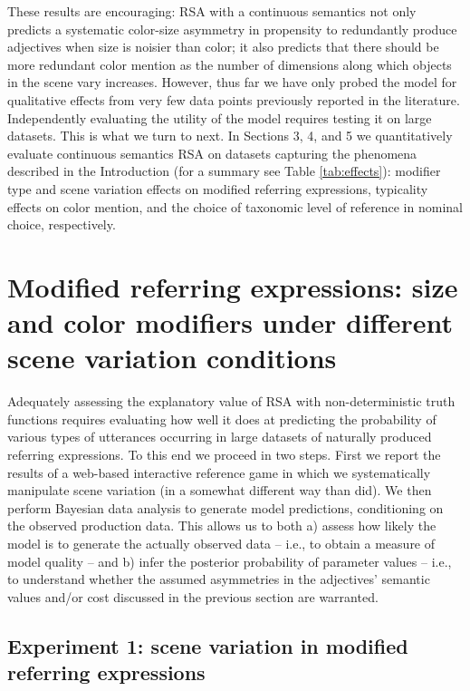 \documentclass[11pt]{article}
\newcommand{\tableref}[1]{Table \ref{#1}}
\begin{document}
These results are encouraging: RSA with a continuous semantics not only predicts a systematic color-size asymmetry in propensity to redundantly produce adjectives when size is noisier than color; it also predicts that there should be more redundant color mention as the number of dimensions along which objects in the scene vary increases. However, thus far we have only probed the model for qualitative effects from very few data points previously reported in the literature. Independently evaluating the utility of the model requires  testing it on large datasets. This is what we turn to next. In Sections 3, 4, and 5 we quantitatively evaluate continuous semantics RSA on datasets capturing the phenomena described in the Introduction (for a summary see \tableref{tab:effects}): modifier type and scene variation effects on modified referring expressions, typicality effects on color mention, and the choice of taxonomic level of reference in nominal choice, respectively.

\section{Modified referring expressions: size and color modifiers under different scene variation conditions}
\label{sec:rsaevaluationbasicscene}

Adequately assessing the explanatory value of RSA with non-deterministic truth functions requires evaluating how well it does at predicting the probability of various types of utterances occurring in large datasets of naturally produced referring expressions. To this end we proceed in two steps. First we report the results of a web-based interactive reference game in which we systematically manipulate scene variation (in a somewhat different way than  did). We then perform Bayesian data analysis to generate model predictions, conditioning on the observed production data. This allows us to both a) assess  how likely the model is to generate the actually observed data -- i.e., to obtain a measure of model quality -- and b) infer the posterior probability of parameter values -- i.e., to understand whether the assumed asymmetries in the adjectives' semantic values and/or cost discussed in the previous section are warranted.


\subsection{Experiment 1: scene variation in modified referring expressions}
\label{sec:exp1-scenevar}
\end{document}
